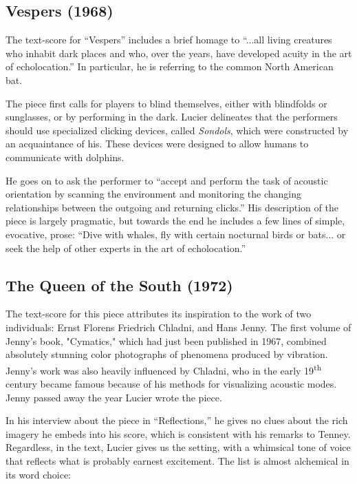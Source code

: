\documentclass[a4paper,10pt]{report}
\numberwithin{equation}{section}
\begin{document}
 \subsection{Vespers (1968)}

The text-score for ``Vespers'' includes a brief homage to ``...all living creatures who inhabit dark places and who, over the years, have developed acuity in the art of echolocation.''\cite[p.~312]{lucier1995} In particular, he is referring to the common North American bat.\cite[p.~86]{lucier2012} 

The piece first calls for players to blind themselves, either with blindfolds or sunglasses, or by performing in the dark. Lucier delineates that the performers should use specialized clicking devices, called \emph{Sondols}, which were constructed by an acquaintance of his. These devices were designed to allow humans to communicate with dolphins.

He goes on to ask the performer to ``accept and perform the task of acoustic orientation by scanning the environment and monitoring the changing relationships between the outgoing and returning clicks.''\cite[p.312]{lucier1995} His description of the piece is largely pragmatic, but towards the end he includes a few lines of simple, evocative, prose:
``Dive with whales, fly with certain nocturnal birds or bats... or seek the help of other experts in the art of echolocation.''\cite[p.~314]{lucier1995}


\subsection{The Queen of the South (1972)}

The text-score for this piece attributes its inspiration to the work of two individuals: Ernst Florens Friedrich Chladni, and Hans Jenny. The first volume of Jenny's book, "Cymatics," which had just been published in 1967, combined absolutely stunning color photographs of phenomena produced by vibration. Jenny's work was also heavily influenced by Chladni, who in the early 19\textsuperscript{th} century became famous because of his methods for visualizing acoustic modes. Jenny passed away the year Lucier wrote the piece. 

In his interview about the piece in ``Reflections,'' he gives no clues about the rich imagery he embeds into his score, which is consistent with his remarks to Tenney. Regardless, in the text, Lucier gives us the setting, with a whimsical tone of voice that reflects what is probably earnest excitement. The list is almost alchemical in its word choice: 
\end{document}

